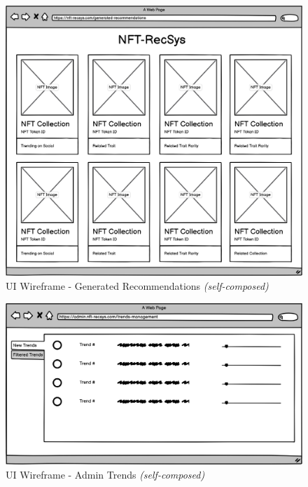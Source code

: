 \begin{figure}[h!]
\centering
\includegraphics[width=\textwidth]{images/appendix/UI Wireframes/Generated Recommendations.png}
\caption{UI Wireframe - Generated Recommendations \textit{(self-composed)}}
\end{figure}

\begin{figure}[h!]
\centering
\includegraphics[width=\textwidth]{images/appendix/UI Wireframes/Admin Trends.png}
\caption{UI Wireframe - Admin Trends \textit{(self-composed)}}
\end{figure}

